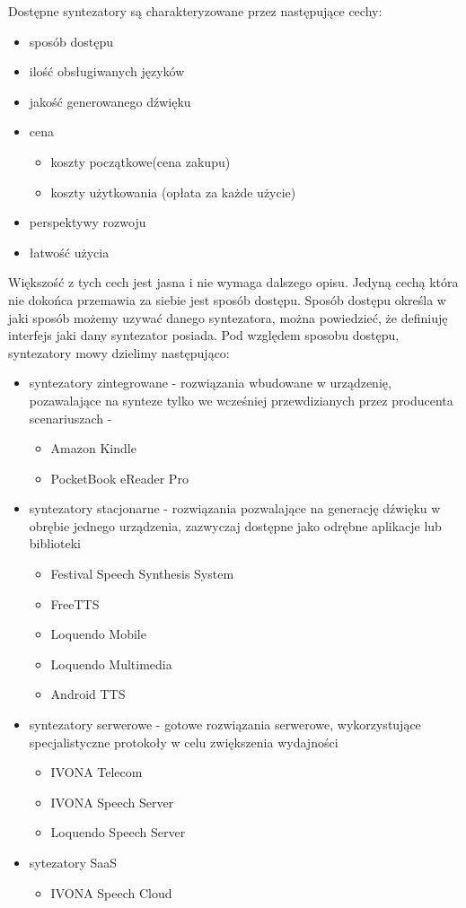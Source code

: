 Dostępne syntezatory są charakteryzowane przez następujące cechy:
\begin{itemize}
	\item sposób dostępu
	\item ilość obsługiwanych języków
	\item jakość generowanego dźwięku
	\item cena
	\begin{itemize}
		\item koszty początkowe(cena zakupu)
		\item koszty użytkowania (opłata za każde użycie)
	\end{itemize}
	\item perspektywy rozwoju
	\item łatwość użycia
\end{itemize}

Większość z tych cech jest jasna i nie wymaga dalszego opisu. Jedyną cechą która nie dokońca przemawia za siebie jest sposób dostępu. Sposób dostępu określa w jaki sposób możemy uzywać danego syntezatora, można powiedzieć, że definiuję interfejs jaki dany syntezator posiada. Pod względem sposobu dostępu, syntezatory mowy dzielimy następująco:

\begin{itemize}
	\item syntezatory zintegrowane  - rozwiązania wbudowane w urządzenię, pozawalające na synteze tylko we wcześniej przewdizianych przez producenta scenariuszach - 
		\begin{itemize}
			\item  Amazon Kindle
			\item  PocketBook eReader Pro
		\end{itemize}
	\item syntezatory stacjonarne - rozwiązania pozwalające na generację dźwięku w obrębie jednego urządzenia, zazwyczaj dostępne jako odrębne aplikacje lub biblioteki
		\begin{itemize}
			\item Festival Speech Synthesis System
			\item FreeTTS
			\item Loquendo Mobile
			\item Loquendo Multimedia
			\item Android TTS
		\end{itemize}
	\item syntezatory serwerowe - gotowe rozwiązania serwerowe, wykorzystujące specjalistyczne protokoły w celu zwiększenia wydajności 
		\begin{itemize}
			\item IVONA Telecom
			\item IVONA Speech Server
			\item Loquendo Speech Server
		\end{itemize}
	\item sytezatory SaaS
		\begin{itemize}
			\item IVONA Speech Cloud
		\end{itemize}
\end{itemize}

